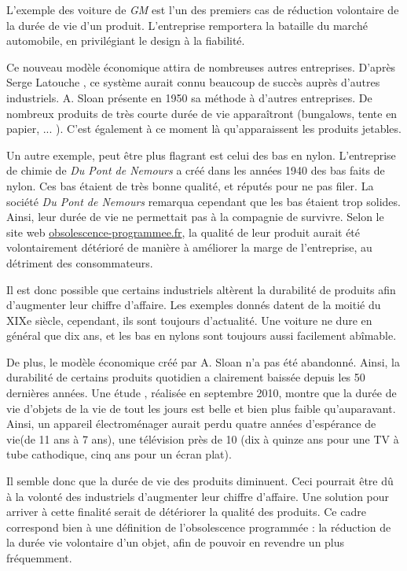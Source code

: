 \smallbreak

L'exemple des voiture de \textit{GM} est l'un des premiers cas de réduction volontaire de la durée de vie d'un produit. L'entreprise remportera la bataille du marché automobile, en privilégiant le design à la fiabilité.

Ce nouveau modèle économique attira de nombreuses autres entreprises. D'après Serge Latouche \cite{bpc}, ce système aurait connu beaucoup de succès auprès d'autres industriels. A. Sloan présente en 1950 sa méthode à d'autres entreprises. De nombreux produits de très courte durée de vie apparaîtront (bungalows, tente en papier, ... ). C'est également à ce moment là qu'apparaissent les produits jetables.
 
 
 \smallbreak
Un autre exemple, peut être plus flagrant est celui des bas en nylon.
L'entreprise de chimie de \textit{Du Pont de Nemours} a créé dans les années 1940 des bas faits de nylon.
Ces bas étaient de très bonne qualité, et réputés pour ne pas filer. La société \textit{Du Pont de Nemours} remarqua cependant que les bas étaient trop solides. 
Ainsi, leur durée de vie ne permettait pas à la compagnie de survivre.
Selon le site web \url{obsolescence-programmee.fr},  la qualité de leur produit aurait été volontairement détérioré de manière à améliorer la marge de l'entreprise, au détriment des consommateurs. 

\medbreak

Il est donc possible que certains industriels altèrent la durabilité de produits afin d'augmenter leur chiffre d'affaire. Les exemples donnés datent de la moitié du XIXe siècle, cependant, ils sont toujours d'actualité. Une voiture ne dure en général que dix ans, et les bas en nylons sont toujours aussi facilement abîmable. 

De plus, le modèle économique créé par A. Sloan n'a pas été abandonné. Ainsi, la durabilité de certains produits quotidien a clairement baissée depuis les 50 dernières années. 
Une étude \cite{opSsg}, réalisée en septembre 2010, montre que la durée de vie d'objets de la vie de tout les jours est belle et bien plus faible qu'auparavant.
Ainsi, un appareil électroménager aurait perdu quatre années d'espérance de vie(de 11 ans à 7 ans), une télévision près de 10 (dix à quinze ans pour une TV à tube cathodique, cinq ans pour un écran plat). 

\medbreak

Il semble donc que la durée de vie des produits diminuent. Ceci pourrait être dû à la volonté des industriels d'augmenter leur chiffre d'affaire. Une solution pour arriver à cette finalité serait de détériorer la qualité des produits. Ce cadre correspond  bien à une définition de l'obsolescence programmée : la réduction de la durée vie volontaire d'un objet, afin de pouvoir en revendre un plus fréquemment. 